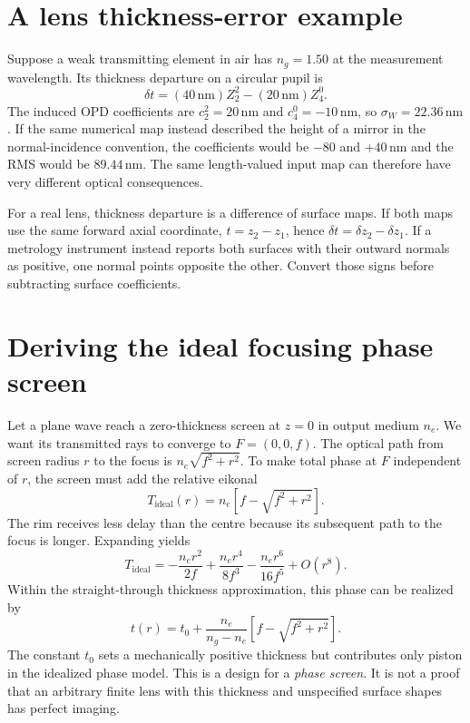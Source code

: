 \section{A lens thickness-error example}
Suppose a weak transmitting element in air has $n_g=1.50$ at the
measurement wavelength. Its thickness departure on a circular pupil is
\begin{equation}
 \delta t=(40\,\mathrm{nm})Z_2^2
                -(20\,\mathrm{nm})Z_4^0.
\end{equation}
The induced OPD coefficients are $c_2^2=20\,\mathrm{nm}$ and
$c_4^0=-10\,\mathrm{nm}$, so $\sigma_W=22.36\,\mathrm{nm}$.
If the same numerical map instead described the height of a mirror
in the normal-incidence convention, the coefficients would be
$-80$ and $+40\,\mathrm{nm}$ and the RMS would be $89.44\,\mathrm{nm}$.
The same length-valued input map can therefore have very different
optical consequences.

For a real lens, thickness departure is a difference of surface maps.
If both maps use the same forward axial coordinate,
$t=z_2-z_1$, hence $\delta t=\delta z_2-\delta z_1$. If a metrology
instrument instead reports both surfaces with their outward normals as
positive, one normal points opposite the other. Convert those signs
before subtracting surface coefficients.

\section{Deriving the ideal focusing phase screen}
Let a plane wave reach a zero-thickness screen at $z=0$ in output medium
$n_e$. We want its transmitted rays to converge to $F=(0,0,f)$.
The optical path from screen radius $r$ to the focus is
$n_e\sqrt{f^2+r^2}$. To make total phase at $F$ independent of $r$,
the screen must add the relative eikonal
\begin{equation}
 T_{\mathrm{ideal}}(r)=n_e\left[f-\sqrt{f^2+r^2}\right].
 \label{zc:idealscreen}
\end{equation}
The rim receives less delay than the centre because its subsequent
path to the focus is longer. Expanding yields
\begin{equation}
 T_{\mathrm{ideal}}=-\frac{n_er^2}{2f}
            +\frac{n_er^4}{8f^3}-\frac{n_er^6}{16f^5}+O(r^8).
 \label{zc:idealscreenseries}
\end{equation}
Within the straight-through thickness approximation, this phase can
be realized by
\begin{equation}
 t(r)=t_0+\frac{n_e}{n_g-n_e}
                       \left[f-\sqrt{f^2+r^2}\right].
\end{equation}
The constant $t_0$ sets a mechanically positive thickness but contributes
only piston in the idealized phase model. This is a design for a
\emph{phase screen}. It is not a proof that an arbitrary finite lens
with this thickness and unspecified surface shapes has perfect imaging.

